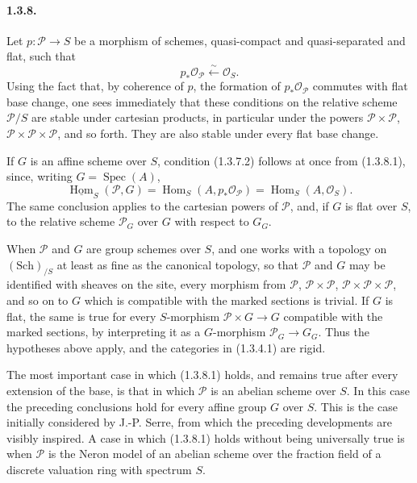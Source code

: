 \documentclass[11pt]{article}
\theoremstyle{plain}
\theoremstyle{definition}
\theoremstyle{remark}
\DeclareMathOperator{\Spec}{Spec}
\DeclareMathOperator{\Hom}{Hom}
\begin{document}
\paragraph{1.3.8.} Let $p:\mathcal P\to S$ be a morphism of schemes, quasi-compact and quasi-separated and flat, such that
\begin{equation}
p_*\mathcal O_{\mathcal P}\xleftarrow{\sim}\mathcal O_S.
\tag{1.3.8.1}
\end{equation}
Using the fact that, by coherence of $p$, the formation of $p_*\mathcal O_{\mathcal P}$ commutes with flat base change, one sees immediately that these conditions on the relative scheme $\mathcal P/S$ are stable under cartesian products, in particular under the powers $\mathcal P\times\mathcal P$, $\mathcal P\times\mathcal P\times\mathcal P$, and so forth. They are also stable under every flat base change.

If $G$ is an affine scheme over $S$, condition (1.3.7.2) follows at once from (1.3.8.1), since, writing $G=\Spec(A)$,
\[
\underline{\Hom}_S(\mathcal P,G)=\Hom_S(A,p_*\mathcal O_{\mathcal P})=\Hom_S(A,\mathcal O_S).
\]
The same conclusion applies to the cartesian powers of $\mathcal P$, and, if $G$ is flat over $S$, to the relative scheme $\mathcal P_G$ over $G$ with respect to $G_G$.

When $\mathcal P$ and $G$ are group schemes over $S$, and one works with a topology on $(\mathrm{Sch})_{/S}$ at least as fine as the canonical topology, so that $\mathcal P$ and $G$ may be identified with sheaves on the site, every morphism from $\mathcal P$, $\mathcal P\times\mathcal P$, $\mathcal P\times\mathcal P\times\mathcal P$, and so on to $G$ which is compatible with the marked sections is trivial. If $G$ is flat, the same is true for every $S$-morphism $\mathcal P\times G\to G$ compatible with the marked sections, by interpreting it as a $G$-morphism $\mathcal P_G\to G_G$. Thus the hypotheses above apply, and the categories in (1.3.4.1) are rigid.

The most important case in which (1.3.8.1) holds, and remains true after every extension of the base, is that in which $\mathcal P$ is an abelian scheme over $S$. In this case the preceding conclusions hold for every affine group $G$ over $S$. This is the case initially considered by J.-P. Serre, from which the preceding developments are visibly inspired. A case in which (1.3.8.1) holds without being universally true is when $\mathcal P$ is the Neron model of an abelian scheme over the fraction field of a discrete valuation ring with spectrum $S$.
\end{document}
